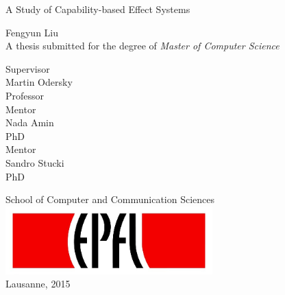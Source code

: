 \begin{titlepage}

  \begin{center}

    \vspace*{3\baselineskip}
    {\Large A Study of Capability-based Effect Systems\\[2cm] }

    \noindent
    Fengyun Liu \\[2cm]

    \noindent
    A thesis submitted for the degree of \emph{Master of Computer Science} \\[2cm]

    \noindent
    \begin{multicols}{3}
    Supervisor \\
    Martin Odersky \\
    Professor \\
    \vfill
    \columnbreak
    Mentor \\
    Nada Amin \\
    PhD \\
    \vfill
    \columnbreak
    Mentor \\
    Sandro Stucki\\
    PhD \\
    \end{multicols}

    \vspace*{3\baselineskip}

    \noindent
    {School of Computer and Communication Sciences \\[1cm]}
    \includegraphics[width=0.6\textwidth]{img/epfl}~\\[1cm]
    \noindent
    Lausanne, 2015 \\[1cm]



  \end{center}

\end{titlepage}
